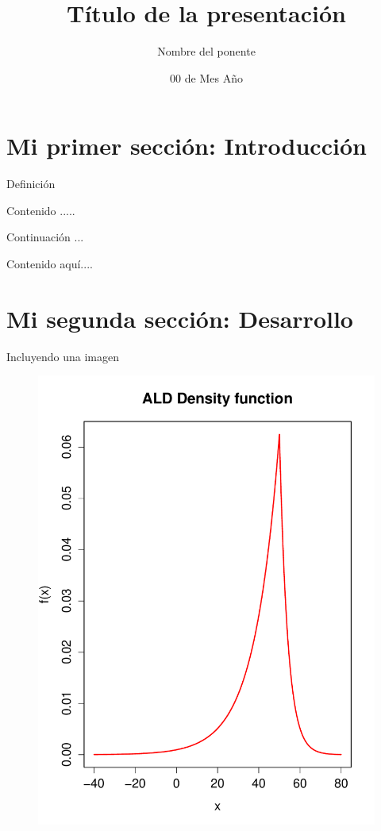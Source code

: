 \documentclass[xcolor=dvipsnames]{beamer}
\title[Nombre de la institución]{Título de la presentación}
\author[Nom abrev de la inst]{Nombre del ponente}
\institute[]{Nombre de la institución}
\date{00 de Mes Año}
\begin{document}
\frame{\titlepage}
\section{Mi primer sección: Introducción}
\begin{frame}{Definición}

Contenido ..... 

\end{frame}
\begin{frame}{Continuación ...}

Contenido aquí....

\end{frame}
\section{Mi segunda sección: Desarrollo}
\begin{frame}{Incluyendo una imagen}

\begin{figure}
\includegraphics[scale=0.42]{fig1}
\end{figure}

\end{frame}
\end{document}
